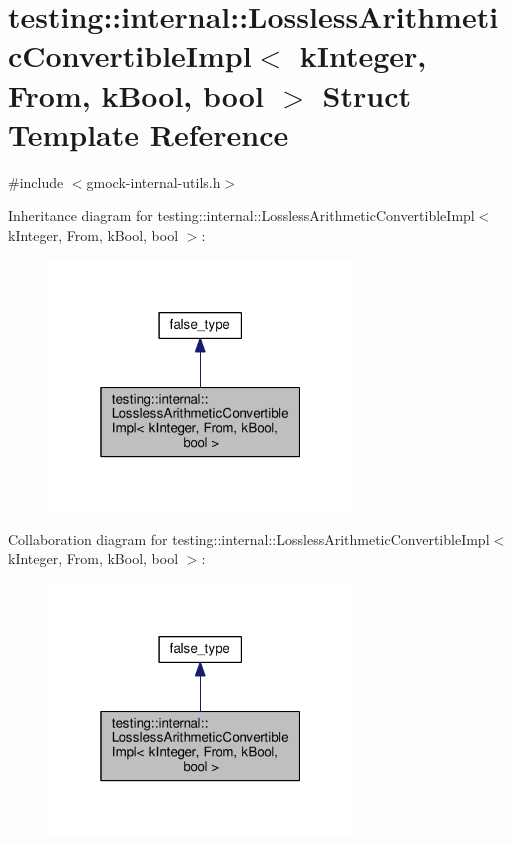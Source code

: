 \hypertarget{structtesting_1_1internal_1_1LosslessArithmeticConvertibleImpl_3_01kInteger_00_01From_00_01kBool_00_01bool_01_4}{}\section{testing\+:\+:internal\+:\+:Lossless\+Arithmetic\+Convertible\+Impl$<$ k\+Integer, From, k\+Bool, bool $>$ Struct Template Reference}
\label{structtesting_1_1internal_1_1LosslessArithmeticConvertibleImpl_3_01kInteger_00_01From_00_01kBool_00_01bool_01_4}


{\ttfamily \#include $<$gmock-\/internal-\/utils.\+h$>$}



Inheritance diagram for testing\+:\+:internal\+:\+:Lossless\+Arithmetic\+Convertible\+Impl$<$ k\+Integer, From, k\+Bool, bool $>$\+:\nopagebreak
\begin{figure}[H]
\begin{center}
\leavevmode
\includegraphics[width=229pt]{structtesting_1_1internal_1_1LosslessArithmeticConvertibleImpl_3_01kInteger_00_01From_00_01kBool_00_01bool_01_4__inherit__graph}
\end{center}
\end{figure}


Collaboration diagram for testing\+:\+:internal\+:\+:Lossless\+Arithmetic\+Convertible\+Impl$<$ k\+Integer, From, k\+Bool, bool $>$\+:\nopagebreak
\begin{figure}[H]
\begin{center}
\leavevmode
\includegraphics[width=229pt]{structtesting_1_1internal_1_1LosslessArithmeticConvertibleImpl_3_01kInteger_00_01From_00_01kBool_00_01bool_01_4__coll__graph}
\end{center}
\end{figure}
